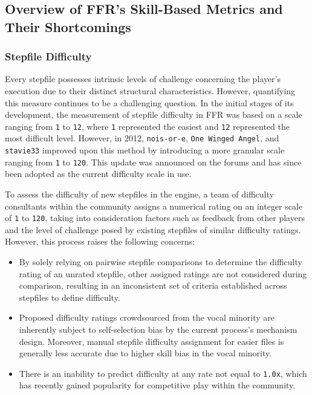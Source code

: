 \subsection{Overview of FFR's Skill-Based Metrics and Their Shortcomings}
\subsubsection{Stepfile Difficulty}
Every stepfile possesses intrinsic levels of challenge concerning the player's execution due to their distinct structural characteristics. However, quantifying this measure continues to be a challenging question. In the initial stages of its development, the measurement of stepfile difficulty in FFR was based on a scale ranging from \texttt{1} to \texttt{12}, where \texttt{1} represented the easiest and \texttt{12} represented the most difficult level. However, in 2012, \texttt{nois-or-e}, \texttt{One Winged Angel}, and \texttt{stavie33} improved upon this method by introducing a more granular scale ranging from \texttt{1} to \texttt{120}. This update was announced on the forums \cite{20120608} and has since been adopted as the current difficulty scale in use.

\vspace{2mm}

To assess the difficulty of new stepfiles in the engine, a team of difficulty consultants within the community assigns a numerical rating on an integer scale of \texttt{1} to \texttt{120}, taking into consideration factors such as feedback from other players and the level of challenge posed by existing stepfiles of similar difficulty ratings. However, this process raises the following concerns:
\begin{itemize}
	\item By solely relying on pairwise stepfile comparisons to determine the difficulty rating of an unrated stepfile, other assigned ratings are not considered during comparison, resulting in an inconsistent set of criteria established across stepfiles to define difficulty.
	\item Proposed difficulty ratings crowdsourced from the vocal minority are inherently subject to self-selection bias by the current process's mechanism design. Moreover, manual stepfile difficulty assignment for easier files is generally less accurate due to higher skill bias in the vocal minority.
	\item There is an inability to 
	      predict difficulty at any rate not equal to \texttt{1.0x}, which has recently gained popularity for competitive play within the community.
\end{itemize}

